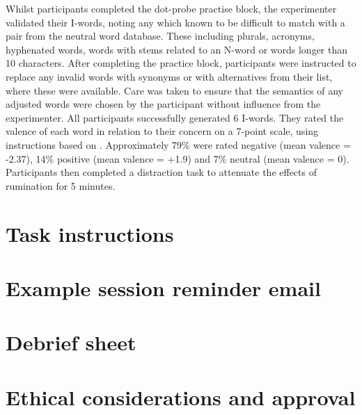 \documentclass[man,floatsintext,a4paper,biblatex]{apa6}\usepackage[]{graphicx}\usepackage[]{color}
\begin{document}
Whilst participants completed the dot-probe practise block, the
experimenter validated their I-words, noting any which known to be
difficult to match with a pair from the neutral word database. These
including plurals, acronyms, hyphenated words, words with stems
related to an N-word or words longer than 10 characters. After
completing the practice block, participants were instructed to
replace any invalid words with synonyms or with alternatives
from their list, where these were available. Care was taken
to ensure that the semantics of any adjusted words were chosen
by the participant without influence from the experimenter. All
participants successfully generated 6 I-words. They rated the valence
of each word in relation to their concern on a 7-point scale, using
instructions based on \textcite{citron_how_2014}. Approximately
79\% were rated negative (mean valence = -2.37), 14\% positive (mean
valence = +1.9) and 7\% neutral (mean valence = 0). Participants then
completed a distraction task to attenuate the effects of rumination
\parencite{nolen-hoeksema_rethinking_2008} for 5 minutes.

%

%

\section{Task instructions}
\label{app:taskinstructions}


\section{Example session reminder email}
\label{app:reminder}


\section{Debrief sheet}
\label{app:debrief}


\section{Ethical considerations and approval}
\label{app:ethics}
\end{document}
